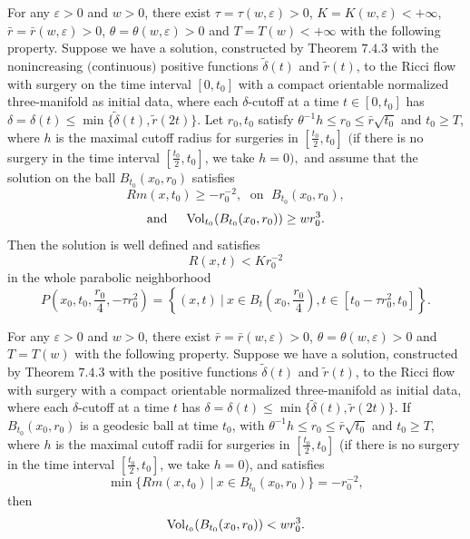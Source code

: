 \begin{theorem}
  \label{thm:cz-large-time-surgery-curvature-estimate}

For any $\varepsilon > 0$ and $w>0$, there exist
$\tau=\tau(w,\varepsilon)>0$, $K=K(w,\varepsilon)<+\infty$,
$\bar{r}=\bar{r}(w,\varepsilon)>0$,
$\theta=\theta(w,\varepsilon)>0$ and $T=T(w) < +\infty$ with the
following property. Suppose we have a solution, constructed by
Theorem $7.4.3$ with the nonincreasing $($continuous$)$ positive
functions $\widetilde{\delta}(t)$ and $\widetilde{r}(t)$, to the
Ricci flow with surgery on the time interval $[0,t_0]$ with a
compact orientable normalized three-manifold as initial data,
where each $\delta$-cutoff at a time $t \in [0,t_0]$ has
$\delta=\delta(t) \leq \min
\{\widetilde{\delta}(t),\widetilde{r}(2t)\}$. Let $r_0,t_0$
satisfy $\theta^{-1}h\leq r_0\leq \bar{r}\sqrt{t_0}$ and $t_0 \geq
T$, where $h$ is the maximal cutoff radius for surgeries in
$[\frac{t_0}{2},t_0]$ $($if there is no surgery in the time
interval $[\frac{t_0}{2},t_0]$, we take $h=0),$ and assume that
the solution on the ball $B_{t_0}(x_0,r_0)$ satisfies
$$
Rm(x,t_0) \geq -r^{-2}_0,\; \mbox{ on }\; B_{t_0}(x_0,r_0),
$$
$$
\mbox{and }\quad  \operatorname{Vol}_{t_0}(B_{t_0}(x_0,r_0)) \geq w r^3_0.
$$
Then the solution is well defined and satisfies
$$
R(x,t)<Kr^{-2}_0
$$
in the whole parabolic neighborhood
$$
P\left(x_0,t_0,\frac{r_0}{4},-\tau r^2_0\right) =\left\{(x,t)\ |\ x\in
B_t\left(x_0,\frac{r_0}{4}\right),t\in[t_0-\tau r^2_0,t_0]\right\}.
$$
\end{theorem}
\begin{corollary}
  \label{cor:cz-large-time-local-volume-canonical-neighborhoods}

For any $\varepsilon > 0$ and $w>0$, there exist
$\bar{r}=\bar{r}(w,\varepsilon)>0$,
$\theta=\theta(w,\varepsilon)>0$ and $T=T(w)$ with the following
property. Suppose we have a solution, constructed by Theorem
$7.4.3$ with the positive functions $\widetilde{\delta}(t)$ and
$\widetilde{r}(t)$, to the Ricci flow with surgery with a compact
orientable normalized three-manifold as initial data, where each
$\delta$-cutoff at a time $t$ has $\delta=\delta(t)\leq
\min\{\widetilde{\delta}(t), \widetilde{r}(2t)\}$. If
$B_{t_0}(x_0,r_0)$ is a geodesic ball at time $t_0$, with
$\theta^{-1}h\leq r_0\leq \bar{r}\sqrt{t_0}$ and $t_0 \geq T$,
where $h$ is the maximal cutoff radii for surgeries in
$[\frac{t_0}{2},t_0]$ (if there is no surgery in the time interval
$[\frac{t_0}{2},t_0]$, we take $h=0$), and satisfies
$$
\min\{Rm(x,t_0)\ |\ x\in B_{t_0}(x_0,r_0)\}=-r^{-2}_0,
$$
then
$$
\operatorname{Vol}_{t_0}(B_{t_0}(x_0,r_0))<w r^3_0.
$$
\end{corollary}
